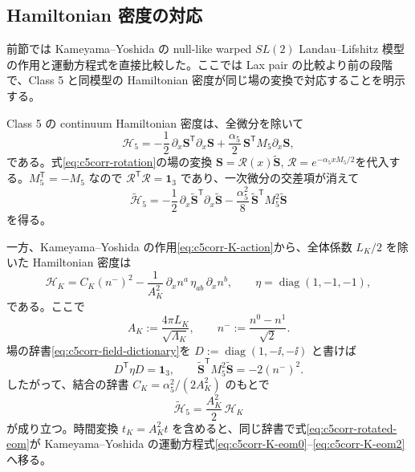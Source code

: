 \subsection{Hamiltonian 密度の対応}

前節では Kameyama--Yoshida の null-like warped $SL(2)$ Landau--Lifshitz 模型の作用と運動方程式を直接比較した。ここでは Lax pair の比較より前の段階で、Class 5 と同模型の Hamiltonian 密度が同じ場の変換で対応することを明示する。

Class 5 の continuum Hamiltonian 密度は、全微分を除いて
\begin{equation}
\mathcal H_5
=-\frac12\,\partial_x\boldsymbol S^{\mathsf T}\partial_x\boldsymbol S
+\frac{\alpha_5}{2}\,
\boldsymbol S^{\mathsf T}M_5\partial_x\boldsymbol S,
\label{eq:c5corr-H5-density}
\end{equation}
である。式\eqref{eq:c5corr-rotation}の場の変換
$\boldsymbol S=\mathcal R(x)\widetilde{\boldsymbol S}$,
$\mathcal R=e^{-\alpha_5xM_5/2}$を代入する。$M_5^{\mathsf T}=-M_5$ なので
$\mathcal R^{\mathsf T}\mathcal R=\mathbf1_3$ であり、一次微分の交差項が消えて
\begin{equation}
\widetilde{\mathcal H}_5
=-\frac12\,
\partial_x\widetilde{\boldsymbol S}^{\mathsf T}
\partial_x\widetilde{\boldsymbol S}
-\frac{\alpha_5^2}{8}\,
\widetilde{\boldsymbol S}^{\mathsf T}M_5^2
\widetilde{\boldsymbol S}
\label{eq:c5corr-H5-rotated}
\end{equation}
を得る。

一方、Kameyama--Yoshida の作用\eqref{eq:c5corr-K-action}から、全体係数 $L_K/2$ を除いた Hamiltonian 密度は
\begin{equation}
\mathcal H_K
=C_K(n^-)^2
-\frac{1}{A_K^2}\,
\partial_x n^a\,\eta_{ab}\,\partial_x n^b,
\qquad
\eta=\operatorname{diag}(1,-1,-1),
\label{eq:c5corr-HK-density}
\end{equation}
である。ここで
\begin{equation}
A_K:=\frac{4\pi L_K}{\sqrt{\Lambda_K}},
\qquad
n^-:=\frac{n^0-n^1}{\sqrt2}.
\end{equation}
場の辞書\eqref{eq:c5corr-field-dictionary}を
$D:=\operatorname{diag}(1,-\ii,-\ii)$ と書けば
\begin{equation}
D^{\mathsf T}\eta D=\mathbf1_3,
\qquad
\widetilde{\boldsymbol S}^{\mathsf T}M_5^2
\widetilde{\boldsymbol S}=-2(n^-)^2.
\label{eq:c5corr-H-map-identities}
\end{equation}
したがって、結合の辞書
$C_K=\alpha_5^2/(2A_K^2)$ のもとで
\begin{equation}
\widetilde{\mathcal H}_5
=\frac{A_K^2}{2}\,\mathcal H_K
\label{eq:c5corr-Hamiltonian-density-map}
\end{equation}
が成り立つ。時間変換 $t_K=A_K^2t$ を含めると、同じ辞書で式\eqref{eq:c5corr-rotated-eom}が Kameyama--Yoshida の運動方程式\eqref{eq:c5corr-K-eom0}--\eqref{eq:c5corr-K-eom2}へ移る。

